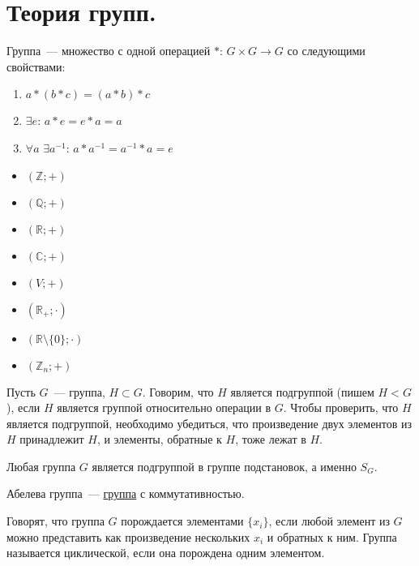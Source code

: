 \documentclass[12pt]{article}
\begin{document}
	\tableofcontents
	\setcounter{tocdepth}{3}
	\newpage
	\section{Теория групп.}
	\begin{definition}
		\label{group-def}
		Группа~--- множество с одной операцией $*$: $G \times G \rightarrow G$ со следующими свойствами:
		\begin{enumerate}
			\item $a * (b * c) = (a * b) * c$
			\item $\exists e$: $a * e = e * a = a$
			\item $\forall a$ $\exists a^{-1}$: $a * a^{-1} = a^{-1} * a = e$
		\end{enumerate}
	\end{definition}
	\begin{example}
		\begin{itemize}
			\item $(\mathbb{Z}; +)$
			\item $(\mathbb{Q}; +)$
			\item $(\mathbb{R}; +)$
			\item $(\mathbb{C}; +)$
			\item $(V; +)$
			\item $(\mathbb{R}_+; \cdot)$
			\item $(\mathbb{R} \setminus \{ 0 \}; \cdot)$
			\item $(\mathbb{Z}_n; +)$
		\end{itemize}
	\end{example}
	\begin{definition}
		Пусть $G$~--- группа, $H \subset G$. Говорим, что $H$ является подгруппой (пишем $H < G$), если $H$ является группой относительно операции в $G$. Чтобы проверить, что $H$ является подгруппой, необходимо убедиться, что произведение двух элементов из $H$ принадлежит $H$, и элементы, обратные к $H$, тоже лежат в $H$.
	\end{definition}
	\begin{theorem}[Кэли]
		Любая группа $G$ является подгруппой в группе подстановок, а именно $S_G$.
	\end{theorem}
	\begin{definition}
		Абелева группа~--- \hyperref[group-def]{группа} с коммутативностью.
	\end{definition}
	\begin{definition}
		Говорят, что группа $G$ порождается элементами $\{ x_i \}$, если любой элемент из $G$ можно представить как произведение нескольких $x_i$ и обратных к ним. Группа называется циклической, если она порождена одним элементом.
	\end{definition}
\end{document}
